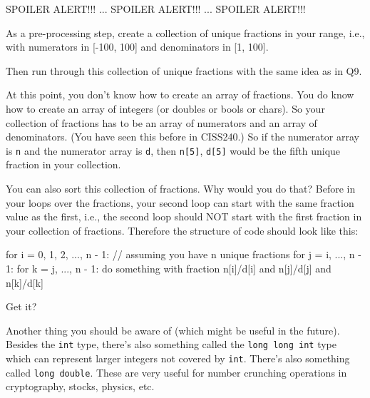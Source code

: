 SPOILER ALERT!!! ... 
SPOILER ALERT!!! ... 
SPOILER ALERT!!!

As a pre-processing step,
create a collection of unique fractions in your range, i.e., with
numerators in [-100, 100]
and denominators in [1, 100].

Then run through this collection of unique fractions with the same
idea as in Q9.

At this point, you don't know how to create an array of fractions.
You do know how to create an array of integers (or doubles or bools or chars).
So your collection of fractions has to be an array of numerators
and an array of denominators.
(You have seen this before in CISS240.)
So if the numerator array is \verb!n!
and the numerator array is \verb!d!,
then \verb!n[5]!,
\verb!d[5]!
would be the fifth unique fraction in your collection.

You can also sort this collection of fractions.
Why would you do that?
Before in your loops over the fractions, your second loop
can start with the same fraction value as the first, i.e., the second
loop should NOT start with the first fraction in your collection of fractions.
Therefore the structure of code should look like this:
\begin{console}
for i = 0, 1, 2, ..., n - 1: // assuming you have n unique fractions
    for j = i, ..., n - 1:
        for k = j, ..., n - 1:
            do something with fraction n[i]/d[i] and n[j]/d[j] and n[k]/d[k]  
\end{console}
Get it?

Another thing you should be aware of (which might be useful in the future).
Besides the \verb!int! type, there's also something called the
\verb!long long int! type which can represent larger integers not covered by
\verb!int!.
There's also something called \verb!long double!.
These are very useful for number crunching operations in cryptography, stocks,
physics, etc.

